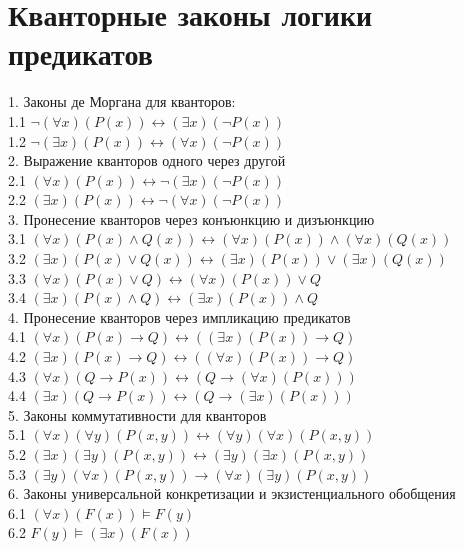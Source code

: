 \documentclass[../main.tex]{subfiles}
\begin{document}
\section{Кванторные законы логики предикатов}
1. Законы де Моргана для кванторов: \\
1.1 $\lnot (\forall x)(P(x)) \leftrightarrow (\exists x)(\lnot P(x))$ \\
1.2 $\lnot (\exists x)(P(x)) \leftrightarrow (\forall x)(\lnot P(x))$ \\
2. Выражение кванторов одного через другой \\
2.1 $(\forall x)(P(x)) \leftrightarrow \lnot (\exists x)(\lnot P(x))$ \\
2.2 $(\exists x)(P(x)) \leftrightarrow \lnot (\forall x)(\lnot P(x))$ \\
3. Пронесение кванторов через конъюнкцию и дизъюнкцию \\
3.1 $(\forall x) (P(x)\land Q(x)) \leftrightarrow (\forall x)(P(x)) \land (\forall x)(Q(x))$ \\
3.2 $(\exists x) (P(x)\lor Q(x)) \leftrightarrow (\exists x) (P(x)) \lor (\exists x)(Q(x))$ \\
3.3 $(\forall x)(P(x)\lor Q) \leftrightarrow (\forall x)(P(x))\lor Q$ \\
3.4 $(\exists x)(P(x)\land Q) \leftrightarrow (\exists x)(P(x))\land Q$ \\
4. Пронесение кванторов через импликацию предикатов \\ 
4.1 $(\forall x)(P(x)\to Q) \leftrightarrow ((\exists x)(P(x))\to Q)$ \\
4.2 $(\exists x)(P(x)\to Q) \leftrightarrow ((\forall x)(P(x))\to Q)$ \\
4.3 $(\forall x)(Q\to P(x)) \leftrightarrow (Q\to (\forall x)(P(x)))$ \\
4.4 $(\exists x)(Q\to P(x)) \leftrightarrow (Q\to (\exists x)(P(x)))$ \\
5. Законы коммутативности для кванторов \\ 
5.1 $(\forall x)(\forall y)(P(x,y)) \leftrightarrow (\forall y)(\forall x)(P(x,y))$ \\
5.2 $(\exists x)(\exists y)(P(x,y)) \leftrightarrow (\exists y)(\exists x)(P(x,y))$ \\
5.3 $(\exists y)(\forall x)(P(x,y)) \to (\forall x)(\exists y)(P(x,y))$ \\
6. Законы универсальной конкретизации и экзистенциального обобщения \\ 
6.1 $(\forall x)(F(x))\vDash F(y)$ \\
6.2 $F(y)\vDash (\exists x)(F(x))$ \\
\end{document}
